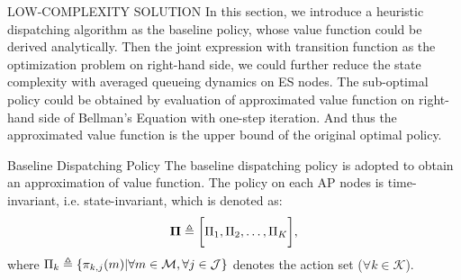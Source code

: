 \documentclass[10pt, conference, letterpaper]{IEEEtran}
\newcommand{\define}{\triangleq}
\renewcommand{\vec}{\mathbf}
\DeclarePairedDelimiter{\set}{\{}{\}}
\DeclarePairedDelimiter{\Bracket}{\bigg[}{\bigg]}
\newcommand{\apSet}{\mathcal{K}}
\newcommand{\esSet}{\mathcal{M}}
\newcommand{\jSpace}{\mathcal{J}}
\begin{document}
    \begin{section}{LOW-COMPLEXITY SOLUTION}
        \label{sec:algorithm}
        In this section, we introduce a heuristic dispatching algorithm as the baseline policy, whose value function could be derived analytically. Then the joint expression with transition function as the optimization problem on right-hand side, we could further reduce the state complexity with averaged queueing dynamics on ES nodes.
        The sub-optimal policy could be obtained by evaluation of approximated value function on right-hand side of Bellman's Equation with one-step iteration. And thus the approximated value function is the upper bound of the original optimal policy.

        \begin{subsection}{Baseline Dispatching Policy}
            The baseline dispatching policy is adopted to obtain an approximation of value function. The policy on each AP nodes is time-invariant, i.e. state-invariant, which is denoted as:
            \begin{align}
                \vec{\Pi} \define \Bracket{\Pi_1, \Pi_2, \dots, \Pi_K},
            \end{align}
            where $\Pi_k \define \set{\pi_{k,j}(m)|\forall m\in\esSet,\forall j\in\jSpace}$ denotes the action set ($\forall k\in\apSet$).


\end{subsection}
\end{section}
\end{document}
